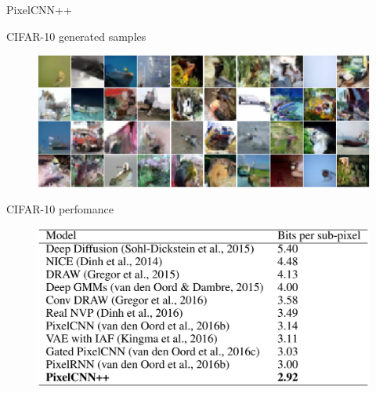 \begin{frame}{PixelCNN++}
	\begin{block}{CIFAR-10 generated samples}
		\begin{figure}
			\centering
	  		\includegraphics[width=0.7\linewidth]{figs/pixelcnn++samples}
		\end{figure}
	\end{block}
	\vspace{-0.2cm}
	\begin{block}{CIFAR-10 perfomance}
		\vspace{-0.3cm}
		\begin{figure}
			\centering
	  		\includegraphics[width=0.5\linewidth]{figs/pixelcnn++results}
		\end{figure}
	\end{block}
\end{frame}

